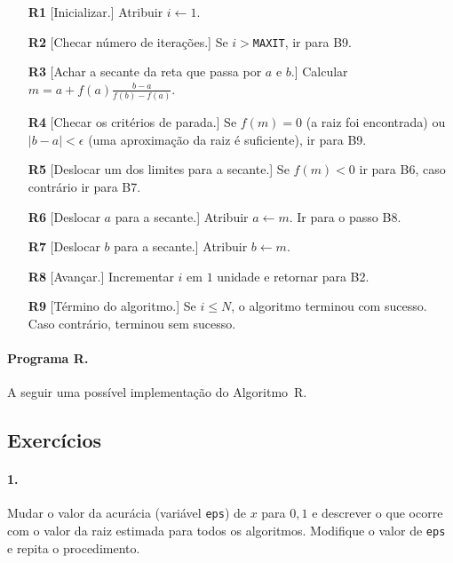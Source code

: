 \begin{itemize}
\item[\bf R1] [Inicializar.] Atribuir $i \leftarrow 1$.
\item[\bf R2] [Checar número de iterações.] Se $i>${\tt MAXIT}, 
		ir para B9.

\item[\bf R3] [Achar a secante da reta que passa por $a$ e $b$.] 
	Calcular \\\hbox{$m = a+ f(a)\frac{b-a}{f(b)-f(a)}$}.

\item[\bf R4] [Checar os critérios de parada.] Se $f(m)=0$
	(a raiz foi encontrada)
	ou \hbox{$|b-a| < \epsilon$} (uma aproximação da
	raiz é suficiente), ir para B9.

\item[\bf R5] [Deslocar um dos limites para a secante.]
	Se $f(m)<0$ ir para B6, caso contrário 
	ir para B7.

\item[\bf R6] [Deslocar $a$ para a secante.] Atribuir
	$a\leftarrow m$. Ir para o passo B8.

\item[\bf R7] [Deslocar $b$ para a secante.] Atribuir
	$b\leftarrow m$.

\item[\bf R8] [Avançar.] Incrementar $i$ em $1$ unidade e
	retornar para B2.

\item[\bf R9] [Término do algoritmo.] Se $i\leq N$, o algoritmo
	terminou com sucesso. Caso contrário, terminou 
	sem sucesso.\quad\pfbox
\end{itemize}

\pagebreak
\paragraph{Programa R.} A seguir uma possível implementação 
do Algoritmo~R.



\subsection*{Exercícios}

\paragraph{1.} Mudar o valor da acurácia (variável {\tt eps}) de $x$ para $0,1$ e
descrever o que ocorre com o valor da raiz estimada para todos 
os algoritmos. Modifique o valor de {\tt eps} e repita o procedimento.


